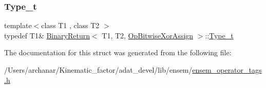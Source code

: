 \mbox{\label{structBinaryReturn_3_01T1_00_01T2_00_01OpBitwiseXorAssign_01_4_a1f3b2b68c0947783fd491c1f8342dfc0}} 
\subsubsection{\texorpdfstring{Type\_t}{Type\_t}\hspace{0.1cm}{\footnotesize\ttfamily [2/2]}}
{\footnotesize\ttfamily template$<$class T1 , class T2 $>$ \\
typedef T1\& \mbox{\hyperlink{structBinaryReturn}{Binary\+Return}}$<$ T1, T2, \mbox{\hyperlink{structOpBitwiseXorAssign}{Op\+Bitwise\+Xor\+Assign}} $>$\+::\mbox{\hyperlink{structBinaryReturn_3_01T1_00_01T2_00_01OpBitwiseXorAssign_01_4_a1f3b2b68c0947783fd491c1f8342dfc0}{Type\+\_\+t}}}



The documentation for this struct was generated from the following file\+:\begin{DoxyCompactItemize}
\item 
/\+Users/archanar/\+Kinematic\+\_\+factor/adat\+\_\+devel/lib/ensem/\mbox{\hyperlink{lib_2ensem_2ensem__operator__tags_8h}{ensem\+\_\+operator\+\_\+tags.\+h}}\end{DoxyCompactItemize}
